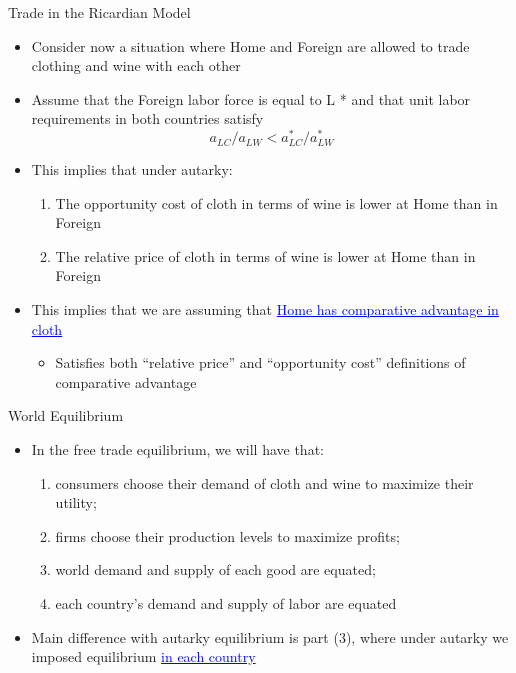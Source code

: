 \documentclass[10pt,hyperref={CJKbookmarks=true},xcolor=dvipsnames,aspectratio=169]{beamer}
\begin{document}
\begin{frame}{Trade in the Ricardian Model }

\begin{itemize}
\item Consider now a situation where Home and Foreign are allowed to trade
clothing and wine with each other 
\item Assume that the Foreign labor force is equal to L {*} and that unit
labor requirements in both countries satisfy 
\[
a_{LC}/a_{LW}<a{}_{LC}^{*}/a_{LW}^{*}
\]

\item This implies that under autarky: 

\begin{enumerate}
\item The opportunity cost of cloth in terms of wine is lower at Home than
in Foreign 
\item The relative price of cloth in terms of wine is lower at Home than
in Foreign 
\end{enumerate}
\item This implies that we are assuming that \textcolor{blue}{\uline{Home
has comparative advantage in cloth }}

\begin{itemize}
\item Satisfies both “relative price” and “opportunity cost” definitions
of comparative advantage 
\end{itemize}
\end{itemize}
\end{frame}

\begin{frame}{World Equilibrium }

\begin{itemize}
\item In the free trade equilibrium, we will have that: 

\begin{enumerate}
\item consumers choose their demand of cloth and wine to maximize their
utility;
\item firms choose their production levels to maximize profits; 
\item world demand and supply of each good are equated; 
\item each country’s demand and supply of labor are equated 
\end{enumerate}
\item Main difference with autarky equilibrium is part (3), where under
autarky we imposed equilibrium \textcolor{blue}{\uline{in each
country}} 
\end{itemize}
\end{frame}
\end{document}
